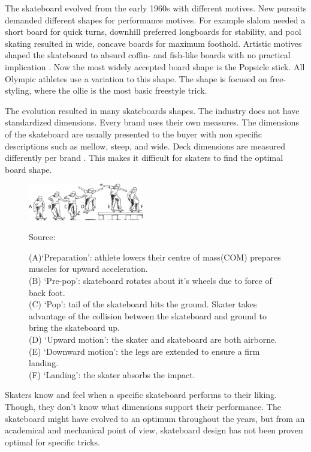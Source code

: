 \documentclass[default,iicol]{sn-jnl}
\theoremstyle{thmstyleone}%
\theoremstyle{thmstyletwo}%
\theoremstyle{thmstylethree}%
\begin{document}
The skateboard evolved from the early 1960s with different motives. New pursuits demanded different shapes for performance motives. For example slalom needed a short board for quick turns, downhill preferred longboards for stability, and pool skating resulted in wide, concave boards for maximum foothold. Artistic motives shaped the skateboard to absurd coffin- and fish-like boards with no practical implication \cite{prentiss_get_2011}. Now the most widely accepted board shape is the Popsicle stick. All Olympic athletes use a variation to this shape. The shape is focused on free-styling, where the ollie is the most basic freestyle trick. 

The evolution resulted in many skateboards shapes. The industry does not have standardized dimensions. Every brand uses their own measures\cite{berger_handmade_2021}. The dimensions of the skateboard are usually presented to the buyer with non specific descriptions such as mellow, steep, and wide. Deck dimensions are measured differently per brand \cite{johnny_skateboarding_2013}. This makes it difficult for skaters to find the optimal board shape.

\begin{figure}[t]
    \centering
        \includegraphics[width = 0.45\textwidth]{figure/f_ollie.png}
        \caption*{\centering \footnotesize Source: \cite{frederick_biomechanics_2006}}
        \caption[Ollie phases]{\footnotesize{(A)`Preparation': athlete lowers their centre of mass(COM) prepares muscles for upward acceleration. \\
        (B) `Pre-pop': skateboard rotates about it's wheels due to force of back foot. \\
        (C) `Pop': tail of the skateboard hits the ground. Skater takes advantage of the collision between the skateboard and ground to bring the skateboard up. \\
        (D) `Upward motion': the skater and skateboard are both airborne. \\
        (E) `Downward motion': the legs are extended to ensure a firm landing. \\
        (F) `Landing': the skater absorbs the impact. }}
        \label{fig:ollie}
\end{figure}

Skaters know and feel when a specific skateboard performs to their liking. Though, they don’t know what dimensions support their performance. The skateboard might have evolved to an optimum throughout the years, but from an academical and mechanical point of view, skateboard design has not been proven optimal for specific tricks.
\end{document}
